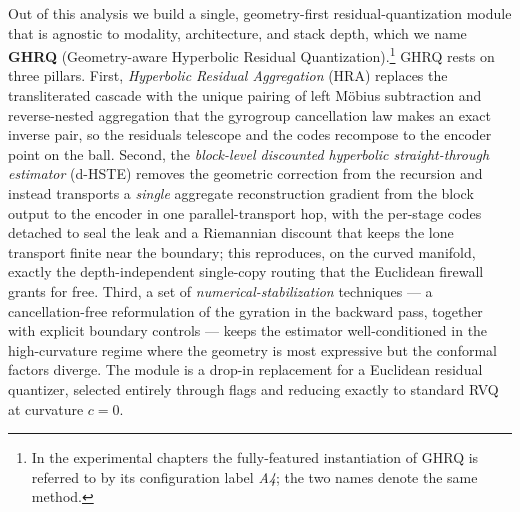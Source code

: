 \documentclass[12pt]{report}
\begin{document}
Out of this analysis we build a single, geometry-first residual-quantization module that is agnostic to modality, architecture, and stack depth, which we name \textbf{GHRQ} (Geometry-aware Hyperbolic Residual Quantization).\footnote{In the experimental chapters the fully-featured instantiation of GHRQ is referred to by its configuration label \emph{A4}; the two names denote the same method.} GHRQ rests on three pillars. First, \emph{Hyperbolic Residual Aggregation} (HRA) replaces the transliterated cascade with the unique pairing of left M\"obius subtraction and reverse-nested aggregation that the gyrogroup cancellation law makes an exact inverse pair, so the residuals telescope and the codes recompose to the encoder point on the ball. Second, the \emph{block-level discounted hyperbolic straight-through estimator} (d-HSTE) removes the geometric correction from the recursion and instead transports a \emph{single} aggregate reconstruction gradient from the block output to the encoder in one parallel-transport hop, with the per-stage codes detached to seal the leak and a Riemannian discount that keeps the lone transport finite near the boundary; this reproduces, on the curved manifold, exactly the depth-independent single-copy routing that the Euclidean firewall grants for free. Third, a set of \emph{numerical-stabilization} techniques --- a cancellation-free reformulation of the gyration in the backward pass, together with explicit boundary controls --- keeps the estimator well-conditioned in the high-curvature regime where the geometry is most expressive but the conformal factors diverge. The module is a drop-in replacement for a Euclidean residual quantizer, selected entirely through flags and reducing exactly to standard RVQ at curvature $c=0$.
\end{document}
